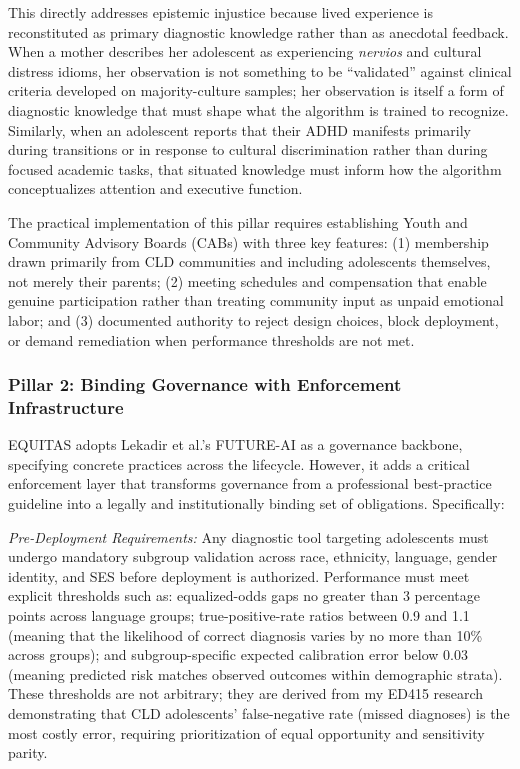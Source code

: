 \documentclass[12pt,letterpaper]{article}
\begin{document}
This directly addresses epistemic injustice because lived experience is reconstituted as primary diagnostic knowledge rather than as anecdotal feedback. When a mother describes her adolescent as experiencing \textit{nervios} and cultural distress idioms, her observation is not something to be ``validated'' against clinical criteria developed on majority-culture samples; her observation is itself a form of diagnostic knowledge that must shape what the algorithm is trained to recognize.\cite{garcia_ed415} Similarly, when an adolescent reports that their ADHD manifests primarily during transitions or in response to cultural discrimination rather than during focused academic tasks, that situated knowledge must inform how the algorithm conceptualizes attention and executive function.\cite{garcia_ed415}

The practical implementation of this pillar requires establishing Youth and Community Advisory Boards (CABs) with three key features: (1) membership drawn primarily from CLD communities and including adolescents themselves, not merely their parents; (2) meeting schedules and compensation that enable genuine participation rather than treating community input as unpaid emotional labor; and (3) documented authority to reject design choices, block deployment, or demand remediation when performance thresholds are not met.\cite{nadarzynski2024}

\subsubsection{Pillar 2: Binding Governance with Enforcement Infrastructure}

EQUITAS adopts Lekadir et al.'s FUTURE-AI as a governance backbone, specifying concrete practices across the lifecycle.\cite{lekadir2025} However, it adds a critical enforcement layer that transforms governance from a professional best-practice guideline into a legally and institutionally binding set of obligations. Specifically:

\textit{Pre-Deployment Requirements:} Any diagnostic tool targeting adolescents must undergo mandatory subgroup validation across race, ethnicity, language, gender identity, and SES before deployment is authorized.\cite{chen2023} Performance must meet explicit thresholds such as: equalized-odds gaps no greater than 3 percentage points across language groups; true-positive-rate ratios between 0.9 and 1.1 (meaning that the likelihood of correct diagnosis varies by no more than 10\% across groups); and subgroup-specific expected calibration error below 0.03 (meaning predicted risk matches observed outcomes within demographic strata).\cite{chen2023} These thresholds are not arbitrary; they are derived from my ED415 research demonstrating that CLD adolescents' false-negative rate (missed diagnoses) is the most costly error, requiring prioritization of equal opportunity and sensitivity parity.\cite{garcia_ed415}
\end{document}
